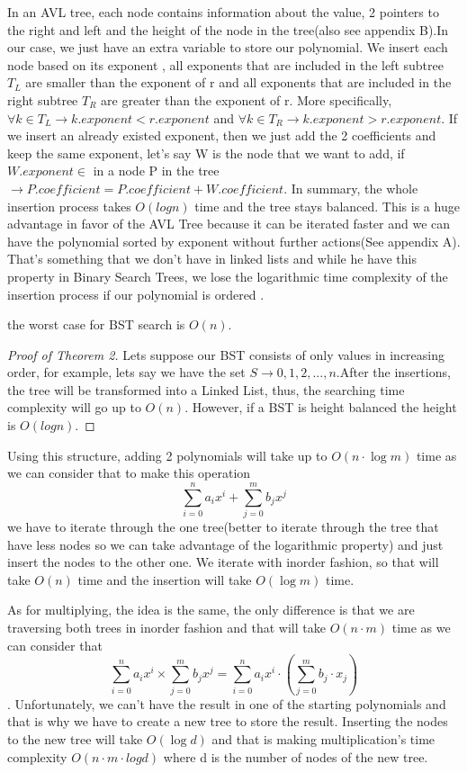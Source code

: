 \documentclass[journal,article,submit,moreauthors,algorithms]{Definitions/mdpi}
\begin{document}
In an AVL tree, each node contains information about the value, 2 pointers to the right and left and the height of the node in the tree\cite{FPO}(also see appendix B).In our case, we just have an extra variable to store our polynomial. We insert each node based on its exponent , all exponents that are included in the left subtree $T_L$ are smaller than the exponent of r and all exponents that are included in the right subtree $T_R$ are greater than the exponent of r. More specifically, $ \forall k \in T_L \rightarrow k.exponent < r.exponent $ and  $\forall k \in T_R \rightarrow k.exponent > r.exponent$. If we insert an already existed exponent, then we just add the 2 coefficients and keep the same exponent, let’s say W is the node that we want to add, if $W.exponent \in $ in a node P in the tree  $\rightarrow P.coefficient = P.coefficient + W.coefficient. $
\medbreak
In summary, the whole insertion process takes $O(logn)$ time and the tree stays balanced. This is a huge advantage in favor of the AVL Tree because it can be iterated faster and we can have the polynomial sorted by exponent without further actions(See appendix A). That’s something that we don’t have in linked lists and while he have this property in Binary Search Trees, we lose the logarithmic time complexity of the insertion process if our polynomial is ordered \cite{BST analysis}.
\begin{Theorem}
the worst case for BST search is $O(n)$.
\end{Theorem}

\begin{proof}[Proof of Theorem 2]
Lets suppose our BST consists of only values in increasing order, for example, lets say we have the set $S \rightarrow {0,1,2,...,n}$.After the insertions, the tree will be transformed into a Linked List, thus, the searching time complexity will go up to $O(n)$. However, if a BST is height balanced the height is $O(logn)$.
\end{proof}



\medbreak
Using this structure, adding 2 polynomials will take up to $O(n\cdot \log m)$ time as we can consider that to make this operation \[\sum_{i=0}^{n} a_ix^i + \sum_{j = 0}^{m} b_jx^j\] we have to iterate through the one tree(better to iterate through the tree that have less nodes so we can take advantage of the logarithmic property) and just insert the nodes to the other one. We iterate with inorder fashion, so that will take $O(n)$ time and the insertion will take $O(\log m)$ time.

\medbreak
As for multiplying, the idea is the same, the only difference is that we are traversing both trees in inorder fashion and that will take $O(n \cdot m)$ time as we can consider that \[\sum_{i=0}^{n} a_ix^i \times \sum_{j = 0}^{m} b_jx^j = \sum_{i = 0}^{n}a_ix^i \cdot (\sum_{j = 0}^{m}b_j \cdot x_j)\]. Unfortunately, we can't have the result in one of the starting polynomials and that is why we have to create a new tree to store the result. Inserting the nodes to the new tree will take $O(\log d)$ and that is making multiplication's time complexity $O(n \cdot m \cdot logd)$ where d is the number of nodes of the new tree.

\end{document}
